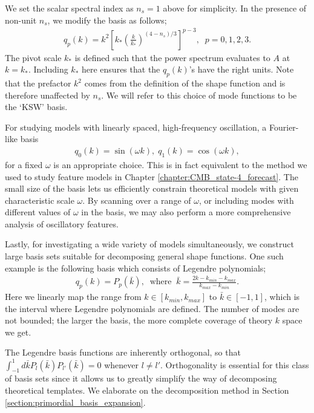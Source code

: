We set the scalar spectral index as $n_s = 1$ above for simplicity. In the presence of non-unit $n_s$, we modify the basis as follows;
\begin{align}
	q_p(k) = k^2 \left[ k_* \left( \frac{k}{k_*} \right)^{(4-n_s)/3} \right]^{p-3}, \;\; p=0,1,2,3. \label{eqn:KSW_basis}
\end{align}
The pivot scale $k_*$ is defined such that the power spectrum evaluates to $A$ at $k=k_*$. Including $k_*$ here ensures that the $q_p(k)$'s have the right units. Note that the prefactor $k^2$ comes from the definition of the shape function and is therefore unaffected by $n_s$. We will refer to this choice of mode functions to be the `KSW' basis.

For studying models with linearly spaced, high-frequency oscillation, a Fourier-like basis
\begin{align}
	q_0(k) = \sin (\omega k), \; q_1(k) = \cos (\omega k), \label{eqn:Fourier_basis}
\end{align}
for a fixed $\omega$ is an appropriate choice. This is in fact equivalent to the method we used to study feature models in Chapter \ref{chapter:CMB_state-4_forecast}. The small size of the basis lets us efficiently constrain theoretical models with given characteristic scale $\omega$. By scanning over a range of $\omega$, or including modes with different values of $\omega$ in the basis, we may also perform a more comprehensive analysis of oscillatory features.

Lastly, for investigating a wide variety of models simultaneously, we construct large basis sets suitable for decomposing general shape functions. One such example is the following basis which consists of Legendre polynomials;
\begin{align}
	q_p(k) = P_p(\bar{k}), \;\;\text{where}\;\; \bar{k} = \frac{2k-k_{min}-k_{max}}{k_{max}-k_{min}}.  \label{eqn:Legendre_basis_no_inv_k}
\end{align}
Here we linearly map the range from $k \in [k_{min},k_{max}]$ to $\bar{k} \in [-1,1]$, which is the interval where Legendre polynomials are defined. The number of modes are not bounded; the larger the basis, the more complete coverage of theory $k$ space we get.

The Legendre basis functions are inherently orthogonal, so that $\int_{-1}^{1} d\bar{k} P_{l}(\bar{k}) P_{l'}(\bar{k}) = 0$ whenever $l \neq l'$. Orthogonality is essential for this class of basis sets since it allows us to greatly simplify the way of decomposing theoretical templates. We elaborate on the decomposition method in Section \ref{section:primordial_basis_expansion}. 

